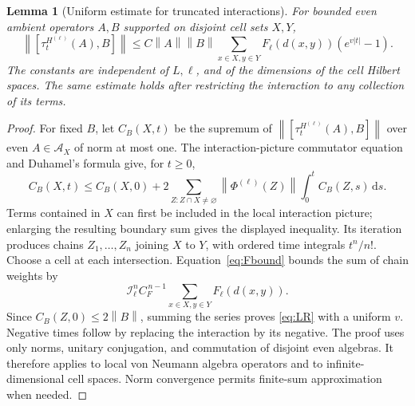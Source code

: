 \documentclass[11pt]{article}
\newtheorem{lemma}[theorem]{Lemma}
\theoremstyle{definition}
\theoremstyle{remark}
\newcommand{\dd}{\,\mathrm d}
\newcommand{\norm}[1]{\left\lVert#1\right\rVert}
\newcommand{\abs}[1]{\left|#1\right|}
\begin{document}
\begin{lemma}[Uniform estimate for truncated interactions]\label{lem:LR}
For bounded even ambient operators \(A,B\) supported on disjoint
cell sets \(X,Y\),
\begin{equation}\label{eq:LR}
 \norm{[\tau_t^{H^{(\ell)}}(A),B]}
 \le C\norm A\norm B
       \sum_{x\in X,y\in Y}F_\ell(d(x,y))
       (e^{v\abs t}-1).
\end{equation}
The constants are independent of \(L,\ell\), and of the dimensions
of the cell Hilbert spaces.  The same estimate holds after
restricting the interaction to any collection of its terms.
\end{lemma}
\begin{proof}
For fixed \(B\), let \(C_B(X,t)\) be the supremum of
\(\norm{[\tau_t^{H^{(\ell)}}(A),B]}\) over even
\(A\in\mathcal A_X\) of norm at most one.  The interaction-picture
commutator equation and Duhamel's formula give, for \(t\ge0\),
\[
 C_B(X,t)\le C_B(X,0)
 +2\sum_{Z:Z\cap X\ne\varnothing}\norm{\Phi^{(\ell)}(Z)}
       \int_0^t C_B(Z,s)\dd s.
\]
Terms contained in \(X\) can first be included in the local
interaction picture; enlarging the resulting boundary sum gives
the displayed inequality.  Its iteration produces chains
\(Z_1,\ldots,Z_n\) joining \(X\) to \(Y\), with ordered time
integrals \(t^n/n!\).  Choose a cell at each intersection.
Equation~\eqref{eq:Fbound} bounds the sum of chain weights by
\[
 \mathcal I_\ell^n C_F^{\,n-1}
       \sum_{x\in X,y\in Y}F_\ell(d(x,y)).
\]
Since \(C_B(Z,0)\le2\norm B\), summing the series proves
\eqref{eq:LR} with a uniform \(v\).  Negative times follow by
replacing the interaction by its negative.  The proof uses only
norms, unitary conjugation, and commutation of disjoint even
algebras.  It therefore applies to local von Neumann algebra
operators and to infinite-dimensional cell spaces.  Norm
convergence permits finite-sum approximation when needed.
\end{proof}
\end{document}

